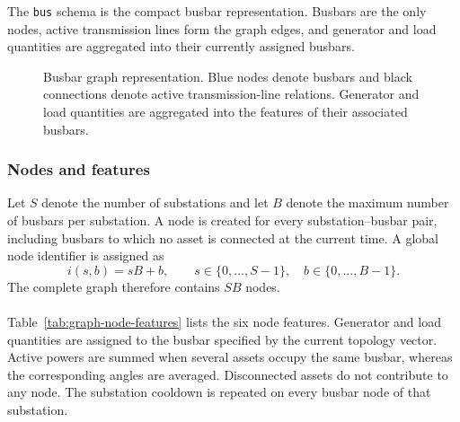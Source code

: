 The \texttt{bus} schema is the compact busbar representation. Busbars are the
only nodes, active transmission lines form the graph edges, and generator and
load quantities are aggregated into their currently assigned busbars.

\begin{figure}[htbp]
  \centering
  \resizebox{0.94\linewidth}{!}{}
  \caption{Busbar graph representation. Blue nodes denote busbars and black
  connections denote active transmission-line relations. Generator and load
  quantities are aggregated into the features of their associated busbars.}
  \label{fig:busbar-graph-representation}
\end{figure}

\subsubsection{Nodes and features}
\label{subsec:graph-busbar-nodes}

Let $S$ denote the number of substations and let $B$ denote the maximum number
of busbars per substation. A node is created for every substation--busbar pair,
including busbars to which no asset is connected at the current time. A global
node identifier is assigned as
\begin{equation}
  i(s,b)=sB+b,
  \qquad s\in\{0,\ldots,S-1\},\quad
  b\in\{0,\ldots,B-1\}.
  \label{eq:busbar-node-id}
\end{equation}
The complete graph therefore contains $SB$ nodes.
\\
\\
Table~\ref{tab:graph-node-features} lists the six node features. Generator and
load quantities are assigned to the
busbar specified by the current topology vector. Active powers are summed when
several assets occupy the same busbar, whereas the corresponding angles are
averaged. Disconnected assets do not contribute to any node. The substation
cooldown is repeated on every busbar node of that substation.

